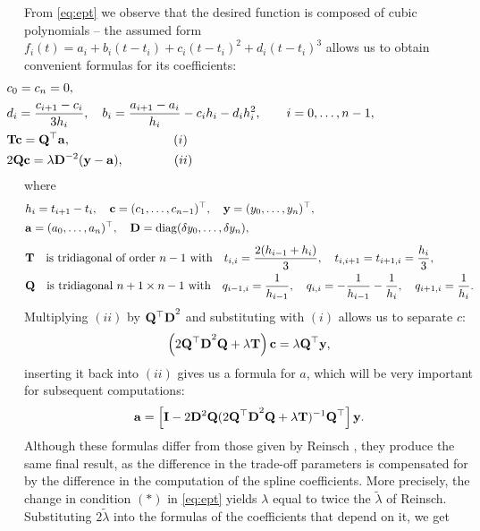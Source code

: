 \documentclass[11pt,leqno]{book}
\theoremstyle{definition}
\theoremstyle{plain}
\theoremstyle{definition}
\begin{document}
{From \eqref{eq:ept} we observe that the desired function is composed of cubic polynomials -- the assumed form $f_i(t) = a_i+b_i(t-t_i)+c_i(t-t_i)^2+d_i(t-t_i)^3$ allows us to obtain convenient formulas for its coefficients:
\begin{equation}
\hspace*{-3.3cm}
\begin{aligned}
&{c}_0={c}_n=0,\\
&{d}_i=\dfrac{{c}_{i+1}-{c}_i}{3{h}_i}, \quad
{b}_i=\dfrac{{a}_{i+1}-{a}_i}{{h}_i}-{c}_i {h}_i-{d}_i {h}_i^2,\qquad i=0,\ldots,n-1,\\
&\vb{Tc}=\vb{Q}^\top \vb{a},\qquad \qquad \qquad \qquad\:(i)\\
&2\vb{Qc}=\lambda \vb{D}^{-2}(\vb{y}-\vb{a}), \qquad \qquad (ii)
\end{aligned}
\end{equation}
where
\begin{align*}
&{h}_i=t_{i+1}-t_i,\quad
\vb{c}=(c_1,\ldots,c_{n-1})^\top ,\quad
\vb{y}=(y_0,\ldots,y_n)^\top ,\\
&\vb{a}=(a_0,\ldots,a_n)^\top ,\quad
\vb{D}=\operatorname{diag}(\delta y_0,\ldots,\delta y_n),\\[4pt]
&\vb{T}\quad \text{is tridiagonal of order $n-1$ with}\quad
t_{i,i}=\dfrac{2({h}_{i-1}+{h}_i)}{3},\quad
t_{i,i+1}=t_{i+1,i}=\dfrac{{h}_i}{3},\\
&\vb{Q}\quad \text{is tridiagonal $n+1 \times n-1$ with}\quad
q_{i-1,i}=\dfrac1{{h}_{i-1}},\quad
q_{i,i}=-\dfrac1{{h}_{i-1}}-\dfrac1{{h}_i},\quad
q_{i+1,i}=\dfrac1{{h}_i}.
\end{align*}
 Multiplying $(ii)$ by $\vb{Q^\top D}^2$ and substituting with $(i)$ allows us to separate $c$:
\begin{equation}
\left(2\vb{Q^\top  D}^2\vb{Q} + \lambda \vb{T}\right)\vb{c} = \lambda \vb{Q}^\top\vb{y},
\label{eq:formulas}
\end{equation}
inserting it back into $(ii)$ gives us a formula for $a$, which will be very important for subsequent computations:
\begin{equation}
\vb{a} = \left[\vb{I} - 2\vb{D}^2\vb{Q}(2\vb{Q^\top  D}^2 \vb{Q} + \lambda \vb{T})^{-1}\vb{Q}^\top \right]\vb{y}.
\label{eq:equation for a}
\end{equation}
 Although these formulas differ from those given by Reinsch \cite{REINSCH1967}, they produce the same final result, as the difference in the trade-off parameters is compensated for by the difference in the computation of the spline coefficients. More precisely, the change in condition $(*)$ in \eqref{eq:ept} yields $\lambda$ equal to twice the $\tilde \lambda$ of Reinsch. Substituting $2\tilde \lambda$ into the formulas of the coefficients that depend on it, we get \[\begin{aligned}

\end{aligned}\]}
\end{document}
